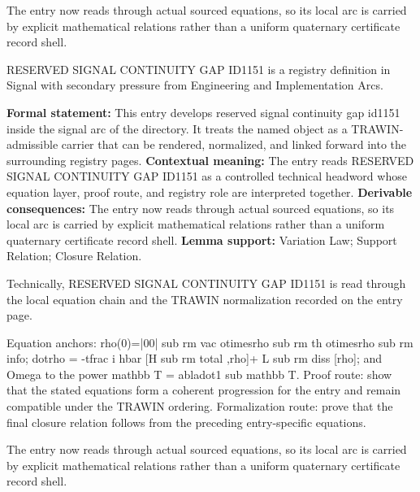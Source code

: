 The entry now reads through actual sourced equations, so its local arc is carried by explicit mathematical relations rather than a uniform quaternary certificate record shell.
\clearpage


\begingroup\small
{}
RESERVED SIGNAL CONTINUITY GAP ID1151 is a registry definition in Signal with secondary pressure from Engineering and Implementation Arcs.

\begingroup\footnotesize\setlength{\emergencystretch}{3em}\sloppy
\textbf{Formal statement:} This entry develops reserved signal continuity gap id1151 inside the signal arc of the directory. It treats the named object as a TRAWIN-admissible carrier that can be rendered, normalized, and linked forward into the surrounding registry pages. \textbf{Contextual meaning:} The entry reads RESERVED SIGNAL CONTINUITY GAP ID1151 as a controlled technical headword whose equation layer, proof route, and registry role are interpreted together. \textbf{Derivable consequences:} The entry now reads through actual sourced equations, so its local arc is carried by explicit mathematical relations rather than a uniform quaternary certificate record shell. \textbf{Lemma support:} Variation Law; Support Relation; Closure Relation.\par
\endgroup

Technically, RESERVED SIGNAL CONTINUITY GAP ID1151 is read through the local equation chain and the TRAWIN normalization recorded on the entry page.

Equation anchors: rho(0)=|00| sub rm vac otimesrho sub rm th otimesrho sub rm info; dotrho = -tfrac i hbar [H sub rm total ,rho]+ L sub rm diss [rho]; and Omega to the power mathbb T = abladot1 sub mathbb T. Proof route: show that the stated equations form a coherent progression for the entry and remain compatible under the TRAWIN ordering. Formalization route: prove that the final closure relation follows from the preceding entry-specific equations.

The entry now reads through actual sourced equations, so its local arc is carried by explicit mathematical relations rather than a uniform quaternary certificate record shell.
\endgroup


